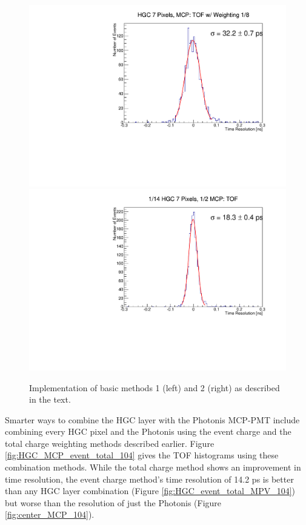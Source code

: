 \documentclass[twocolumn,aps,prd,reprint,superscriptaddress,floatfix]{revtex4-1}
\begin{document}
\begin{figure}[!htbp]
\centering
	\includegraphics[width=.49\textwidth]{deltaT_PicoSil_MCP_Equal104.pdf}
	\includegraphics[width=.49\textwidth]{deltaT_PicoSilEqual_MCP_Equal104.pdf}
	\caption{Implementation of basic methods 1 (left) and 2 (right) as described in the text. }
	\label{fig:m12}
\end{figure}

Smarter ways to combine the HGC layer with the Photonis MCP-PMT include combining every HGC pixel and the Photonis using the event charge and the total charge weighting methods described earlier.
Figure \ref{fig:HGC_MCP_event_total_104} gives the TOF histograms using these combination methods. 
While the total charge method shows an improvement in time resolution, the event charge method's time resolution of 14.2 ps is better than any HGC layer combination (Figure \ref{fig:HGC_event_total_MPV_104}) but worse than the resolution of just the Photonis (Figure \ref{fig:center_MCP_104}).
\end{document}
